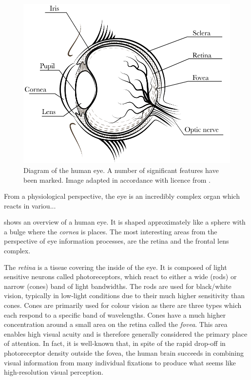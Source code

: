\begin{figure}
    \centering
    \includegraphics[width=0.8\linewidth]{figures/eye.pdf}
    \caption{Diagram of the human eye. A number of significant features have been marked. Image adapted in accordance with licence from \cite{freepik}.}
    \label{fig:anatomy}
\end{figure}

From a physiological perspective, the eye is an incredibly complex organ which reacts in variou...


 shows an overview of a human eye. It is shaped approximately like a sphere with a bulge where the \emph{cornea} is places. The most interesting areas from the perspective of eye information processes, are the retina and the frontal lens complex. 

The \emph{retina} is a tissue covering the inside of the eye. It is composed of light sensitive neurons called photoreceptors, which react to either a wide (rods) or narrow (cones) band of light bandwidths. The rods are used for black/white vision, typically in low-light conditions due to their much higher sensitivity than cones. Cones are primarily used for colour vision as there are three types which each respond to a specific band of wavelengths. Cones have a much higher concentration around a small area on the retina called the \emph{fovea}. This area enables high visual acuity and is therefore generally considered the primary place of attention. In fact, it is well-known that, in spite of the rapid drop-off in photoreceptor density outside the fovea, the human brain succeeds in combining visual information from many individual fixations to produce what seems like high-resolution visual perception.

